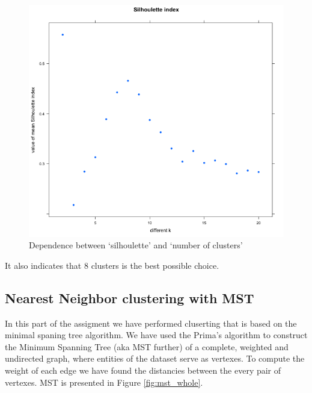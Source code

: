 {{\begin{figure}[h]
	\centering
	\begin{minipage}[h]{0.49\linewidth}
		\includegraphics[width=1.2\linewidth]{images/silhoulette_index.png}
	\end{minipage}
	\caption{Dependence between `silhoulette' and `number of clusters'}
	\label{fig:silhoulette_index}	
\end{figure}

It also indicates that 8 clusters is the best possible choice.



\subsection{Nearest Neighbor clustering with MST}
	In this part of the assigment we have performed cluserting that is based on the minimal spaning tree algorithm. 
	We have used the Prima's algorithm to construct the Minimum Spanning Tree (aka MST further) of a complete, weighted and undirected graph, where entities of the dataset serve as vertexes.  To compute the weight of each edge we have found the distancies between the every pair of vertexes. MST is presented in Figure \ref{fig:mst_whole}.

}}
